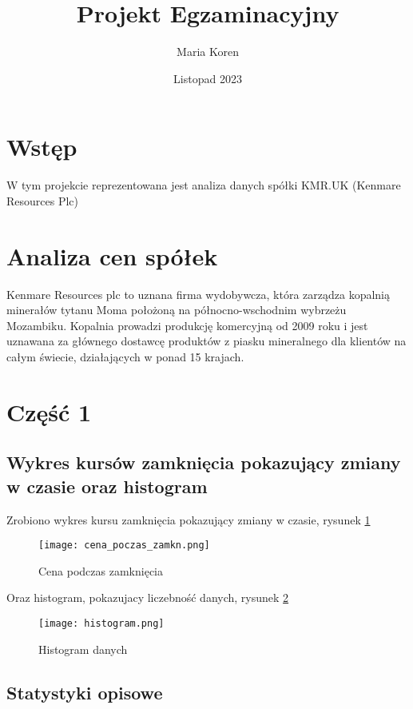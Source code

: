 \documentclass[a4paper,11pt]{article}
\title{Projekt Egzaminacyjny}
\author{Maria Koren}
\date{Listopad 2023}
\begin{document}
\maketitle
\newpage
\tableofcontents{}
\newpage

\section{Wstęp}

W tym projekcie reprezentowana jest analiza danych spółki KMR.UK (Kenmare Resources Plc)
\smallskip


\section {Analiza cen spółek}
Kenmare Resources plc to uznana firma wydobywcza, która zarządza kopalnią minerałów tytanu Moma położoną na północno-wschodnim wybrzeżu Mozambiku.
Kopalnia prowadzi produkcję komercyjną od 2009 roku i jest uznawana za głównego dostawcę produktów z piasku mineralnego dla klientów na całym świecie, działających w ponad
15 krajach.

\section{Część 1}

\subsection{Wykres kursów zamknięcia pokazujący zmiany w czasie oraz
histogram}

Zrobiono wykres  kursu zamknięcia pokazujący zmiany w czasie, rysunek \ref{fig:cena_podcaz_zamkn}

\begin{figure}[h]
  \centering
  \texttt{[image: cena\_poczas\_zamkn.png]}
  \caption{Cena podczas zamknięcia}
  \label{fig:cena_podcaz_zamkn}
\end{figure}

Oraz histogram, pokazujacy liczebność danych, rysunek \ref{fig:histogram}
\newpage
\begin{figure}[h]
  \centering
  \texttt{[image: histogram.png]}
  \caption{Histogram danych}
  \label{fig:histogram}
\end{figure}


\subsection{Statystyki opisowe}
\end{document}
